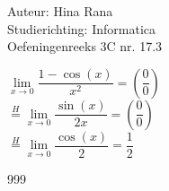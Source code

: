 \documentclass[a4paper]{article}
\begin{document}
\noindent \large Auteur: Hina Rana \\
\noindent \large Studierichting: Informatica\\
\noindent \large Oefeningenreeks 3C nr. 17.3\\

\medskip

\normalsize
$\lim\limits_{x \to 0} \dfrac{1-\cos(x)}{x^2}= \left(\dfrac{0}{0}\right)$\\

$\stackrel{H}{=} \lim\limits_{x \to 0} \dfrac{\sin (x)}{2x} = \left(\dfrac{0}{0}\right)$\\

$\stackrel{H}{=}\lim\limits_{x \to 0} \dfrac{\cos(x)}{2} = \dfrac{1}{2}$


\begin{thebibliography}{999}
\end{thebibliography}
\end{document}

